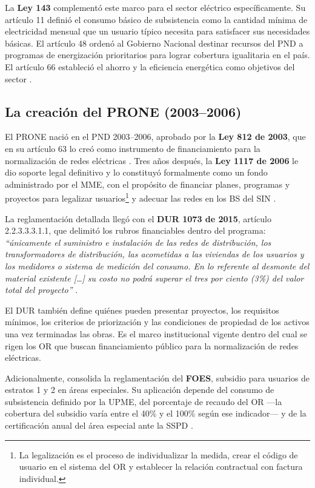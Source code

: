 La \textbf{Ley 143} complementó este marco para el sector eléctrico específicamente. Su artículo 11 definió el consumo básico de subsistencia como la cantidad mínima de electricidad mensual que un usuario típico necesita para satisfacer sus necesidades básicas. El artículo 48 ordenó al Gobierno Nacional destinar recursos del PND a programas de energización prioritarios para lograr cobertura igualitaria en el país. El artículo 66 estableció el ahorro y la eficiencia energética como objetivos del sector \parencite{Ley143_1994}.

\subsection{La creación del PRONE (2003--2006)}
\label{subsec:creacion_prone}

El PRONE nació en el PND 2003--2006, aprobado por la \textbf{Ley 812 de 2003}, que en su artículo 63 lo creó como instrumento de financiamiento para la normalización de redes eléctricas \parencite{Ley812_2003}. Tres años después, la \textbf{Ley 1117 de 2006} le dio soporte legal definitivo y lo constituyó formalmente como un fondo administrado por el MME, con el propósito de financiar planes, programas y proyectos para legalizar usuarios\footnote{La legalización es el proceso de individualizar la medida, crear el código de usuario en el sistema del OR y establecer la relación contractual con factura individual.} y adecuar las redes en los BS del SIN \parencite{Ley1117_2006}.

La reglamentación detallada llegó con el \textbf{DUR 1073 de 2015}, artículo 2.2.3.3.3.1.1, que delimitó los rubros financiables dentro del programa: \textit{``únicamente el suministro e instalación de las redes de distribución, los transformadores de distribución, las acometidas a las viviendas de los usuarios y los medidores o sistema de medición del consumo. En lo referente al desmonte del material existente [\ldots] su costo no podrá superar el tres por ciento (3\%) del valor total del proyecto''} \parencite{DUR1073_2015}.

El DUR también define quiénes pueden presentar proyectos, los requisitos mínimos, los criterios de priorización y las condiciones de propiedad de los activos una vez terminadas las obras. Es el marco institucional vigente dentro del cual se rigen los OR que buscan financiamiento público para la normalización de redes eléctricas.

Adicionalmente, consolida la reglamentación del \textbf{FOES}, subsidio para usuarios de estratos 1 y 2 en áreas especiales. Su aplicación depende del consumo de subsistencia definido por la UPME, del porcentaje de recaudo del OR —la cobertura del subsidio varía entre el 40\% y el 100\% según ese indicador— y de la certificación anual del área especial ante la SSPD \parencite{DUR1073_2015}.

